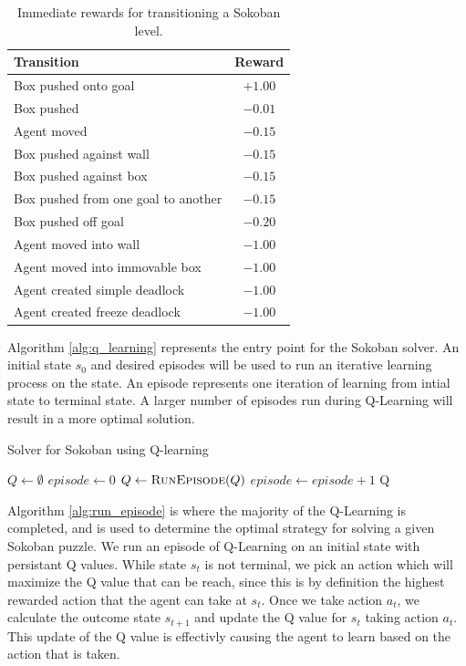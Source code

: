 \documentclass[times, 10pt,twocolumn]{article}
\begin{document}
\begin{table}[htbp]
  \centering
  \begin{tabular}{l c} \hline\hline
    Transition & Reward \\ \hline
    Box pushed onto goal & $+1.00$ \\
    Box pushed & $-0.01$ \\
    Agent moved & $-0.15$ \\
    Box pushed against wall & $-0.15$ \\
    Box pushed against box & $-0.15$ \\
    Box pushed from one goal to another & $-0.15$ \\
    Box pushed off goal & $-0.20$ \\ 
    Agent moved into wall & $-1.00$ \\
    Agent moved into immovable box & $-1.00$ \\
    Agent created simple deadlock & $-1.00$ \\
    Agent created freeze deadlock & $-1.00$ \\ \hline\hline
  \end{tabular}
  \caption{Immediate rewards for transitioning a Sokoban level.}
  \label{table:rewards}
\end{table}


Algorithm \ref{alg:q_learning} represents the entry point for the Sokoban solver.  An initial state $s_0$ and desired episodes will be used to run an iterative learning process on the state.  An episode represents one iteration of learning from intial state to terminal state.  A larger number of episodes run during Q-Learning will result in a more optimal solution.

\begin{algorithm}
  \caption{Solver for Sokoban using Q-learning}
  \begin{algorithmic}[1]
      \State $Q\gets \emptyset$
      \State $episode\gets 0$
        \State $Q\gets \Call{RunEpisode}{Q}$
        \State $episode\gets episode + 1$
      \EndWhile
      \State \Return Q
    \EndFunction
  \end{algorithmic}
\label{alg:q_learning}
\end{algorithm}

Algorithm \ref{alg:run_episode} \cite{Russell}\cite{Guo} is where the majority of the Q-Learning is completed, and is used to determine the optimal strategy for solving a given Sokoban puzzle.  We run an episode of Q-Learning on an initial state with persistant Q values.  While state $s_t$ is not terminal, we pick an action which will maximize the Q value that can be reach, since this is by definition the highest rewarded action that the agent can take at $s_t$.  Once we take action $a_t$, we calculate the outcome state $s_{t+1}$ and update the Q value for $s_t$ taking action $a_t$.  This update of the Q value is effectivly causing the agent to learn based on the action that is taken.
\end{document}
